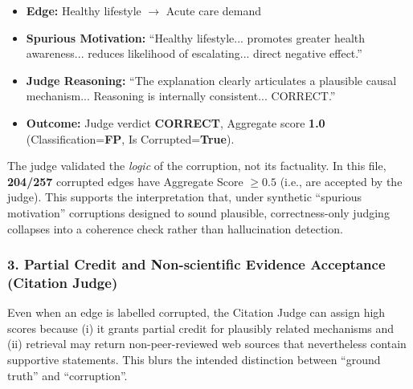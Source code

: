 \begin{itemize}
    \item \textbf{Edge:} Healthy lifestyle $\rightarrow$ Acute care demand
    \item \textbf{Spurious Motivation:} ``Healthy lifestyle... promotes greater health awareness... reduces likelihood of escalating... direct negative effect.''
    \item \textbf{Judge Reasoning:} ``The explanation clearly articulates a plausible causal mechanism... Reasoning is internally consistent... CORRECT.''
    \item \textbf{Outcome:} Judge verdict \textbf{CORRECT}, Aggregate score \textbf{1.0} (Classification=\textbf{FP}, Is Corrupted=\textbf{True}).
\end{itemize}
The judge validated the \textit{logic} of the corruption, not its factuality. In this file, \textbf{204/257} corrupted edges have Aggregate Score $\geq 0.5$ (i.e., are accepted by the judge). This supports the interpretation that, under synthetic ``spurious motivation'' corruptions designed to sound plausible, correctness-only judging collapses into a coherence check rather than hallucination detection.

\subsubsection{3. Partial Credit and Non-scientific Evidence Acceptance (Citation Judge)}
Even when an edge is labelled corrupted, the Citation Judge can assign high scores because (i) it grants partial credit for plausibly related mechanisms and (ii) retrieval may return non-peer-reviewed web sources that nevertheless contain supportive statements. This blurs the intended distinction between ``ground truth'' and ``corruption''.

